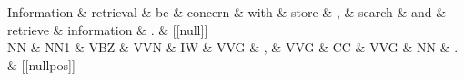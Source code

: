\documentclass{article}
\begin{document}
\begin{dependency}[theme = simple]
\begin{deptext}[column sep=1em]
Information \& retrieval \& be \& concern \& with \& store \& , \& search \& and \& retrieve \& information \& . \& {[}{[}null{]}{]} \\
NN \& NN1 \& VBZ \& VVN \& IW \& VVG \& , \& VVG \& CC \& VVG \& NN \& . \& {[}{[}nullpos{]}{]} \\
\end{deptext}
\end{dependency}
\end{document}
